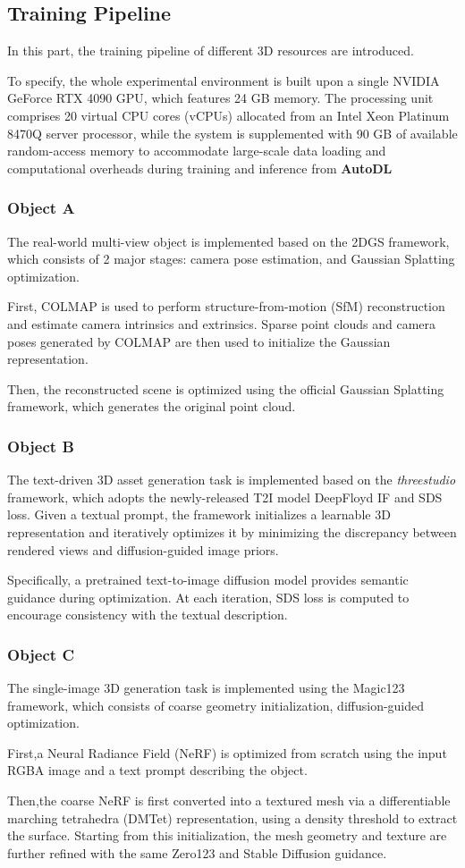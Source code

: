 \subsection{Training Pipeline}
In this part, the training pipeline of different 3D resources are introduced.

To specify, the whole experimental environment is built upon a single NVIDIA GeForce RTX 4090 GPU, which features 24 GB memory. The processing unit comprises 20 virtual CPU cores (vCPUs) allocated from an Intel Xeon Platinum 8470Q server processor, while the system is supplemented with 90 GB of available random-access memory to accommodate large-scale data loading and computational overheads during training and inference from \textbf{AutoDL}
\subsubsection{Object A}
The real-world multi-view object is implemented based on the 2DGS framework, which consists of 2 major stages: camera pose estimation, and Gaussian Splatting optimization.

First, COLMAP is used to perform structure-from-motion (SfM) reconstruction and estimate camera intrinsics and extrinsics. Sparse point clouds and camera poses generated by COLMAP are then used to initialize the Gaussian representation.

Then, the reconstructed scene is optimized using the official Gaussian Splatting framework, which generates the original point cloud.



\subsubsection{Object B}
The text-driven 3D asset generation task is implemented based on the \textit{threestudio} framework, which adopts the newly-released T2I model DeepFloyd IF and SDS loss. Given a textual prompt, the framework initializes a learnable 3D representation and iteratively optimizes it by minimizing the discrepancy between rendered views and diffusion-guided image priors.

Specifically, a pretrained text-to-image diffusion model provides semantic guidance during optimization. At each iteration, SDS loss is computed to encourage consistency with the textual description.

\subsubsection{Object C}
The single-image 3D generation task is implemented using the Magic123 framework, which consists of coarse geometry initialization, diffusion-guided optimization.

First,a Neural Radiance Field (NeRF) is optimized from scratch using the input RGBA image and a text prompt describing the object.

Then,the coarse NeRF is first converted into a textured mesh via a differentiable marching tetrahedra (DMTet) representation, using a density threshold to extract the surface.
Starting from this initialization, the mesh geometry and texture are further refined with the same Zero123 and Stable Diffusion guidance.